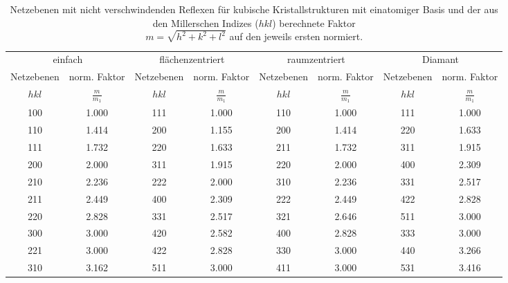 \begin{table}[!h]
	\centering
	\begin{adjustbox}{width=\textwidth}
		\begin{tabular}{cccccccc}
			\toprule
			\multicolumn{2}{c}{einfach}&\multicolumn{2}{c}{flächenzentriert} & \multicolumn{2}{c}{raumzentriert}& \multicolumn{2}{c}{Diamant}\\\cmidrule(rl){1-2}\cmidrule(rl){3-4}\cmidrule(rl){5-6}\cmidrule(rl){7-8}
		Netzebenen & norm. Faktor & Netzebenen & norm. Faktor & Netzebenen & norm. Faktor & Netzebenen & norm. Faktor\\
		$hkl$ & $\frac{m}{m_1}$ & $hkl$ & $\frac{m}{m_1}$ & $hkl$ & $\frac{m}{m_1}$ & $hkl$ & $\frac{m}{m_1}$\\
\midrule
		\num{100} & \num{1.000} & \num{111} & \num{1.000} & \num{110} & \num{1.000} & \num{111} & \num{1.000}\\
		\num{110} & \num{1.414} & \num{200} & \num{1.155} & \num{200} & \num{1.414} & \num{220} & \num{1.633}\\
		\num{111} & \num{1.732} & \num{220} & \num{1.633} & \num{211} & \num{1.732} & \num{311} & \num{1.915}\\
		\num{200} & \num{2.000} & \num{311} & \num{1.915} & \num{220} & \num{2.000} & \num{400} & \num{2.309}\\
		\num{210} & \num{2.236} & \num{222} & \num{2.000} & \num{310} & \num{2.236} & \num{331} & \num{2.517}\\
		\num{211} & \num{2.449} & \num{400} & \num{2.309} & \num{222} & \num{2.449} & \num{422} & \num{2.828}\\
		\num{220} & \num{2.828} & \num{331} & \num{2.517} & \num{321} & \num{2.646} & \num{511} & \num{3.000}\\
		\num{300} & \num{3.000} & \num{420} & \num{2.582} & \num{400} & \num{2.828} & \num{333} & \num{3.000}\\
		\num{221} & \num{3.000} & \num{422} & \num{2.828} & \num{330} & \num{3.000} & \num{440} & \num{3.266}\\
		\num{310} & \num{3.162} & \num{511} & \num{3.000} & \num{411} & \num{3.000} & \num{531} & \num{3.416}\\
		\bottomrule
	\end{tabular}
	\end{adjustbox}
	\caption{Netzebenen mit nicht verschwindenden Reflexen für kubische Kristallstrukturen mit einatomiger Basis und der aus 
den Millerschen Indizes ($hkl$) berechnete Faktor\\ $m = \sqrt{h^2+k^2+l^2}$ auf den jeweils ersten normiert. \label{tab:reflexe_1_atom}}
\end{table}
